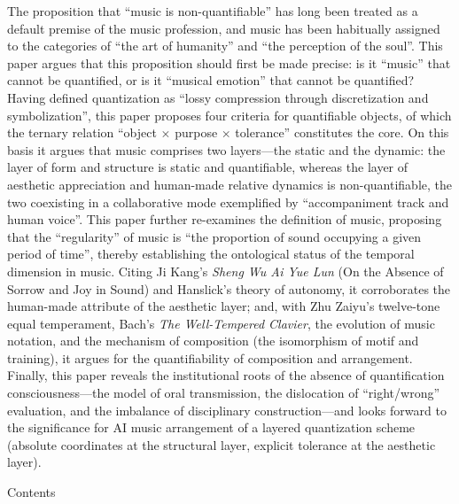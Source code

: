 \documentclass[11pt,a4paper]{article}
\begin{document}
\begin{abstracten}
The proposition that ``music is non-quantifiable'' has long been treated as a default
premise of the music profession, and music has been habitually assigned to the categories
of ``the art of humanity'' and ``the perception of the soul''. This paper argues that this
proposition should first be made precise: is it ``music'' that cannot be quantified, or is
it ``musical emotion'' that cannot be quantified? Having defined quantization as ``lossy
compression through discretization and symbolization'', this paper proposes four criteria
for quantifiable objects, of which the ternary relation ``object $\times$ purpose $\times$
tolerance'' constitutes the core. On this basis it argues that music comprises two
layers---the static and the dynamic: the layer of form and structure is static and
quantifiable, whereas the layer of aesthetic appreciation and human-made relative dynamics
is non-quantifiable, the two coexisting in a collaborative mode exemplified by
``accompaniment track and human voice''. This paper further re-examines the definition of
music, proposing that the ``regularity'' of music is ``the proportion of sound occupying a
given period of time'', thereby establishing the ontological status of the temporal
dimension in music. Citing Ji Kang's \textit{Sheng Wu Ai Yue Lun} (On the Absence of
Sorrow and Joy in Sound) and Hanslick's theory of autonomy, it corroborates the
human-made attribute of the aesthetic layer; and, with Zhu Zaiyu's twelve-tone equal
temperament, Bach's \textit{The Well-Tempered Clavier}, the evolution of music notation,
and the mechanism of composition (the isomorphism of motif and training), it argues for
the quantifiability of composition and arrangement. Finally, this paper reveals the
institutional roots of the absence of quantification consciousness---the model of oral
transmission, the dislocation of ``right/wrong'' evaluation, and the imbalance of
disciplinary construction---and looks forward to the significance for AI music arrangement
of a layered quantization scheme (absolute coordinates at the structural layer, explicit
tolerance at the aesthetic layer).
\end{abstracten}


\newpage
{\sffamily\bfseries\fontsize{14}{17}\selectfont
 \begin{center}Contents\end{center}}
\vspace{0.6em}
\renewcommand{\contentsname}{}
\vspace{-3.2em}
\tableofcontents
\newpage
\end{document}

